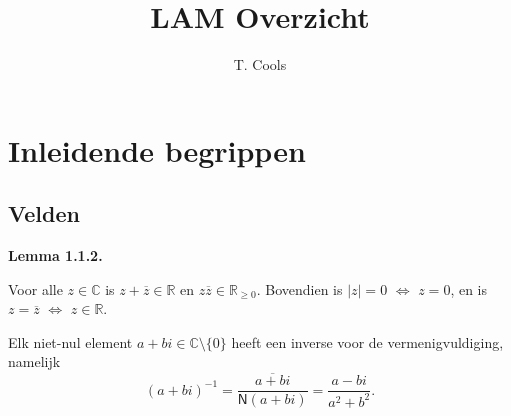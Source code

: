 \documentclass[10pt,a4paper]{article}
\title{\textbf{LAM Overzicht}}
\author{T. Cools}
\date{}
\newenvironment{res}[2]{%
  \par\noindent\textbf{#1 #2.}%
}{%
  \par\vspace{2pt}\normalfont
}
\begin{document}
\maketitle

\section{Inleidende begrippen}

\subsection{Velden}
\begin{res}{Lemma}{1.1.2}
\begin{myenum}
\item Voor alle $z\in\mathbb{C}$ is $z+\overline{z}\in\mathbb{R}$ en $z\overline{z}\in\mathbb{R}_{\ge0}$. Bovendien is $|z|=0$ \(\iff\) $z=0$, en is $z=\overline z$ \(\iff\) $z\in\mathbb R$.
\item Elk niet-nul element $a+bi\in\mathbb C\setminus\{0\}$ heeft een inverse voor de vermenigvuldiging, namelijk
\[
(a+bi)^{-1}=\frac{\overline{a+bi}}{\mathsf N(a+bi)}=\frac{a-bi}{a^2+b^2}.
\]
\end{myenum}
\end{res}
\end{document}
